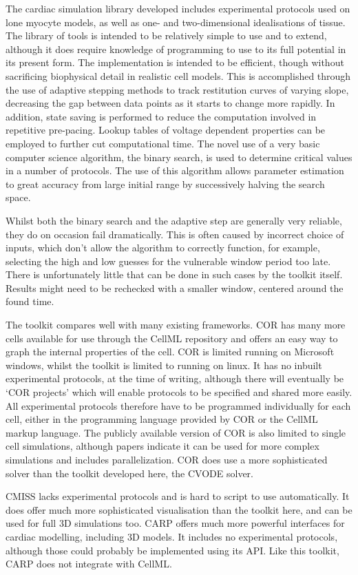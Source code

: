 The cardiac simulation library developed includes experimental protocols used on
lone myocyte models, as well as one- and two-dimensional idealisations of
tissue.
The library of tools is intended to be relatively simple to use and to extend,
although it does require knowledge of programming to use to its full potential
in its present form.
The implementation is intended to be efficient, though without sacrificing
biophysical detail in realistic cell models.
This is accomplished through the use of adaptive stepping methods to track
restitution curves of varying slope, decreasing the gap between data points as
it starts to change more rapidly.
In addition, state saving is performed to reduce the computation involved in
repetitive pre-pacing.
Lookup tables of voltage dependent properties can be employed to further cut
computational time.
The novel use of a very basic computer science algorithm, the binary search, is
used to determine critical values in a number of protocols.
The use of this algorithm allows parameter estimation to great accuracy from
large initial range by successively halving the search space.

Whilst both the binary search and the adaptive step are generally very reliable,
they do on occasion fail dramatically.
This is often caused by incorrect choice of inputs, which don't allow the
algorithm to correctly function, for example, selecting the high and low guesses
for the vulnerable window period too late.
There is unfortunately little that can be done in such cases by the toolkit
itself.
Results might need to be rechecked with a smaller window, centered around the
found time.

The toolkit compares well with many existing frameworks.
COR has many more cells available for use through the CellML repository and
offers an easy way to graph the internal properties of the cell.
COR is limited running on Microsoft windows, whilst the toolkit is limited
to running on linux.
It has no inbuilt experimental protocols, at the time of writing, although there
will eventually be `COR projects' which will enable protocols to be specified
and shared more easily.
All experimental protocols therefore have to be programmed individually for each
cell, either in the programming language provided by COR or the CellML markup
language.
The publicly available version of COR is also limited to single cell
simulations, although papers indicate it can be used for more complex
simulations and includes parallelization.
COR does use a more sophisticated solver than the toolkit developed here, the
CVODE solver.

CMISS lacks experimental protocols and is hard to script to use automatically.
It does offer much more sophisticated visualisation than the toolkit here, and
can be used for full 3D simulations too.
CARP offers much more powerful interfaces for cardiac modelling, including 3D
models.
It includes no experimental protocols, although those could probably be
implemented using its API.
Like this toolkit, CARP does not integrate with CellML.

